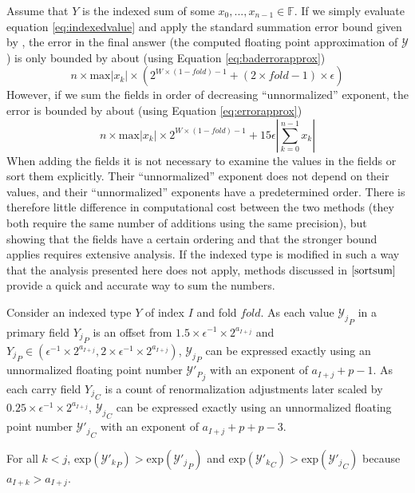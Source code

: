 \documentclass[12pt]{article}
\providecommand{\F}{\ensuremath{\mathbb{F}}}
\providecommand{\exp}{\ensuremath{\text{exp}}}
\providecommand{\max}{\ensuremath{\text{max}}}
\theoremstyle{definition}
\numberwithin{equation}{section}
\begin{document}
    Assume that $Y$ is the indexed sum of some $x_0, ..., x_{n - 1} \in \F$. If we simply evaluate equation \ref{eq:indexedvalue} and apply the standard summation error bound given by \cite{higham}, the error in the final answer (the computed floating point approximation of $\mathcal{Y}$) is only bounded by about (using Equation \ref{eq:baderrorapprox})
    \begin{equation*}
      n \times \max|x_k|\times (2^{W \times (1 - fold) - 1} + (2 \times fold - 1) \times \epsilon)
    \end{equation*}
    However, if we sum the fields in order of decreasing ``unnormalized'' exponent, the error is bounded by about (using Equation \ref{eq:errorapprox})
    \begin{equation*}
      n \times \max|x_k|\times 2^{W \times (1 - fold) - 1} + 15 \epsilon |\sum\limits_{k = 0}^{n - 1} x_k|
    \end{equation*}
    When adding the fields it is not necessary to examine the values in the fields or sort them explicitly. Their ``unnormalized'' exponent does not depend on their values, and their ``unnormalized'' exponents have a predetermined order. There is therefore little difference in computational cost between the two methods (they both require the same number of additions using the same precision), but showing that the fields have a certain ordering and that the stronger bound applies requires extensive analysis. If the indexed type is modified in such a way that the analysis presented here does not apply, methods discussed in $\cite{sortsum}$ provide a quick and accurate way to sum the numbers.

    Consider an indexed type $Y$ of index $I$ and fold $fold$.
    As each value ${\mathcal{Y}_j}_P$ in a primary field ${Y_j}_P$ is an offset from $1.5 \times \epsilon^{-1} \times 2^{a_{I + j}}$ and ${Y_j}_P \in (\epsilon^{-1} \times 2^{a_{I + j}}, 2 \times \epsilon^{-1} \times 2^{a_{I + j}})$, ${\mathcal{Y}_j}_P$ can be expressed exactly using an unnormalized floating point number ${\mathcal{Y}'_P}_j$ with an exponent of $a_{I + j} + p - 1$.
    As each carry field ${Y_j}_C$ is a count of renormalization adjustments later scaled by $0.25 \times \epsilon^{-1} \times 2^{a_{I + j}}$, ${\mathcal{Y}_j}_C$ can be expressed exactly using an unnormalized floating point number ${\mathcal{Y}'_j}_C$ with an exponent of $a_{I + j} + p + p - 3$.

    For all $k < j$, $\exp({\mathcal{Y}'_k}_P) > \exp({\mathcal{Y}'_j}_P)$ and $\exp({\mathcal{Y}'_k}_C) > \exp({\mathcal{Y}'_j}_C)$ because $a_{I + k} > a_{I + j}$.
\end{document}

